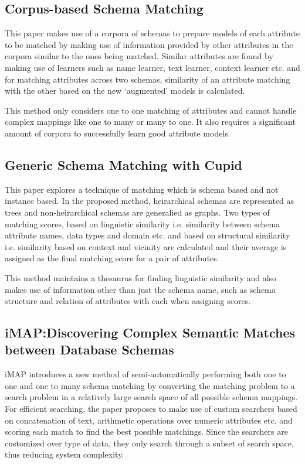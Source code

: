 \documentclass[conference]{IEEEtran}
\begin{document}
\subsection*{\textbf{Corpus-based Schema Matching}\cite{ref4}}
This paper makes use of a corpora of schemas to prepare models of each attribute to be matched by making use of information provided by other attributes in the corpora similar to the ones being matched. Similar attributes are found by making use of learners such as name learner, text learner, context learner etc. and for matching attributes across two schemas, similarity of an attribute matching with the other based on the new `augmented' models is calculated. 

This method only considers one to one matching of attributes and cannot handle complex mappings like one to many or many to one. It also requires a significant amount of corpora to successfully learn good attribute models.


\subsection*{\textbf{Generic Schema Matching with Cupid}\cite{ref3}}
This paper explores a technique of matching which is schema based and not instance based. In the proposed method, heirarchical schemas are represented as trees and non-heirarchical schemas are generalied as graphs. Two types of matching scores, based on linguistic similarity i.e. similarity between schema attribute names, data types and domain etc. and based on structural similarity i.e. similarity based on context and vicinity are calculated and their average is assigned as the final matching score for a pair of attributes.

This method maintains a thesaurus for finding linguistic similarity and also makes use of information other than just the schema name, such as schema structure and relation of attributes with each when assigning scores.


\subsection*{\textbf{iMAP:Discovering Complex Semantic Matches between Database Schemas}\cite{ref5}}
iMAP introduces a new method of semi-automatically performing both one to one and one to many schema matching by converting the matching problem to a search problem in a relatively large search space of all possible schema mappings. For efficient searching, the paper proposes to make use of custom searchers based on concatenation of text, arithmetic operations over numeric attributes etc. and scoring each match to find the best possible matchings. Since the searchers are customized over type of data, they only search through a subset of search space, thus reducing system complexity. 
\end{document}
